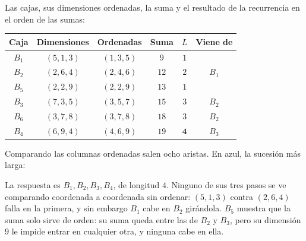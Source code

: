 \documentclass[11pt,letterpaper]{article}
\begin{document}
\begin{ejemplo}
  \label{ej:caminos-cajas}
  Las cajas, sus dimensiones ordenadas, la suma y el resultado de la
  recurrencia en el orden de las sumas:
  \begin{center}
  \small
  \begin{tabular}{cccccc}
    \toprule
    \textbf{Caja} & \textbf{Dimensiones} & \textbf{Ordenadas}
      & \textbf{Suma} & $L$ & \textbf{Viene de} \\
    \midrule
    $B_1$ & $(5, 1, 3)$ & $(1, 3, 5)$ & $9$ & $1$ & \\
    $B_2$ & $(2, 6, 4)$ & $(2, 4, 6)$ & $12$ & $2$ & $B_1$ \\
    $B_5$ & $(2, 2, 9)$ & $(2, 2, 9)$ & $13$ & $1$ & \\
    $B_3$ & $(7, 3, 5)$ & $(3, 5, 7)$ & $15$ & $3$ & $B_2$ \\
    $B_6$ & $(3, 7, 8)$ & $(3, 7, 8)$ & $18$ & $3$ & $B_2$ \\
    $B_4$ & $(6, 9, 4)$ & $(4, 6, 9)$ & $19$ & $\mathbf{4}$ & $B_3$ \\
    \bottomrule
  \end{tabular}
  \end{center}
  Comparando las columnas ordenadas salen ocho aristas. En azul, la
  sucesión más larga:
  \begin{center}
  \end{center}
  La respuesta es $B_1, B_2, B_3, B_4$, de longitud $4$. Ninguno de
  sus tres pasos se ve comparando coordenada a coordenada sin ordenar:
  $(5, 1, 3)$ contra $(2, 6, 4)$ falla en la primera, y sin embargo
  $B_1$ cabe en $B_2$ girándola. $B_5$ muestra que la suma solo sirve
  de orden: su suma queda entre las de $B_2$ y $B_3$, pero su
  dimensión $9$ le impide entrar en cualquier otra, y ninguna cabe en
  ella.
\end{ejemplo}
\end{document}
